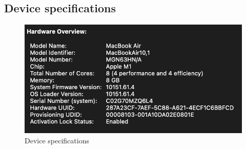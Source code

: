 \documentclass{article}
\begin{document}
\subsection{Device specifications}

\begin{figure}[!htb]
    \centering
    \includegraphics[width=13cm]{device_spec.jpg}
    \caption{Device specifications}
\end{figure}
\end{document}
